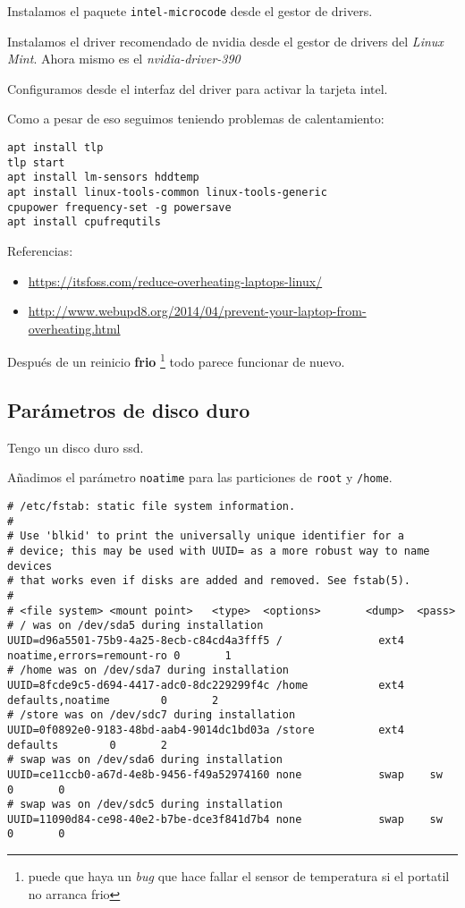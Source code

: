 \documentclass[
  12pt,
  spanish,
]{article}
\providecommand{\tightlist}{%
  \setlength{\itemsep}{0pt}\setlength{\parskip}{0pt}}
\begin{document}
Instalamos el paquete \texttt{intel-microcode} desde el gestor de
drivers.

Instalamos el driver recomendado de nvidia desde el gestor de drivers
del \emph{Linux Mint}. Ahora mismo es el \emph{nvidia-driver-390}

Configuramos desde el interfaz del driver para activar la tarjeta intel.

Como a pesar de eso seguimos teniendo problemas de calentamiento:

\begin{verbatim}
apt install tlp
tlp start
apt install lm-sensors hddtemp
apt install linux-tools-common linux-tools-generic
cpupower frequency-set -g powersave
apt install cpufrequtils
\end{verbatim}

Referencias:

\begin{itemize}
\tightlist
\item
  \url{https://itsfoss.com/reduce-overheating-laptops-linux/}
\item
  \url{http://www.webupd8.org/2014/04/prevent-your-laptop-from-overheating.html}
\end{itemize}

Después de un reinicio \textbf{frio} \footnote{puede que haya un
  \emph{bug} que hace fallar el sensor de temperatura si el portatil no
  arranca frio} todo parece funcionar de nuevo.

\hypertarget{paruxe1metros-de-disco-duro}{%
\subsection{Parámetros de disco
duro}\label{paruxe1metros-de-disco-duro}}

Tengo un disco duro ssd.

Añadimos el parámetro \texttt{noatime} para las particiones de
\texttt{root} y \texttt{/home}.

\begin{verbatim}
# /etc/fstab: static file system information.
#
# Use 'blkid' to print the universally unique identifier for a
# device; this may be used with UUID= as a more robust way to name devices
# that works even if disks are added and removed. See fstab(5).
#
# <file system> <mount point>   <type>  <options>       <dump>  <pass>
# / was on /dev/sda5 during installation
UUID=d96a5501-75b9-4a25-8ecb-c84cd4a3fff5 /               ext4    noatime,errors=remount-ro 0       1
# /home was on /dev/sda7 during installation
UUID=8fcde9c5-d694-4417-adc0-8dc229299f4c /home           ext4    defaults,noatime        0       2
# /store was on /dev/sdc7 during installation
UUID=0f0892e0-9183-48bd-aab4-9014dc1bd03a /store          ext4    defaults        0       2
# swap was on /dev/sda6 during installation
UUID=ce11ccb0-a67d-4e8b-9456-f49a52974160 none            swap    sw              0       0
# swap was on /dev/sdc5 during installation
UUID=11090d84-ce98-40e2-b7be-dce3f841d7b4 none            swap    sw              0       0
\end{verbatim}
\end{document}
